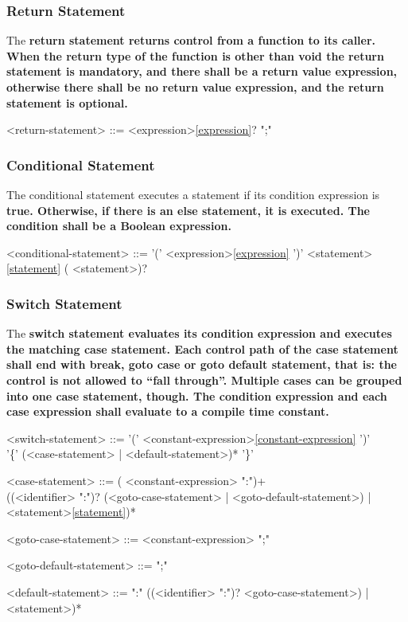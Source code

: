\documentclass[a4paper,oneside,11pt]{article}
\begin{document}
\subsubsection{Return Statement}

The \bf{return} statement returns control from a function to its caller.
When the return type of the function is other than \bf{void}
the return statement is mandatory, and
there shall be a return value expression,
otherwise there shall be no return value expression,
and the return statement is optional.

\begin{grammar}
\label{return-statement}<return-statement> ::=  <expression>\ref{expression}? ";"
\end{grammar}

\subsubsection{Conditional Statement}

The conditional statement executes a statement if its condition expression is \bf{true}.
Otherwise, if there is an else statement, it is executed.
The condition shall be a Boolean expression.

\begin{grammar}
\label{conditional-statement}<conditional-statement> ::=  '(' <expression>\ref{expression} ')' <statement>\ref{statement} ( <statement>)?
\end{grammar}

\subsubsection{Switch Statement}

The \bf{switch} statement evaluates its condition expression
and executes the matching case statement.
Each control path of the \bf{case} statement shall
end with \bf{break}, \bf{goto case} or \bf{goto default} statement,
that is: the control is not allowed to ``fall through''.
Multiple cases can be grouped into one \bf{case} statement, though.
The condition expression and each case expression shall evaluate to a compile time constant.

\begin{grammar}
\label{switch-statement}<switch-statement> ::=  '(' <constant-expression>\ref{constant-expression} ')'\\
'\{' (<case-statement> | <default-statement>)* '\}'

<case-statement> ::= ( <constant-expression> ":")+\\
((<identifier> ":")? (<goto-case-statement> | <goto-default-statement>) | <statement>\ref{statement})*

<goto-case-statement> ::=   <constant-expression> ";"

<goto-default-statement> ::=   ";"

<default-statement> ::=  ":" ((<identifier> ":")? <goto-case-statement>) | <statement>)*

\end{grammar}
\end{document}
